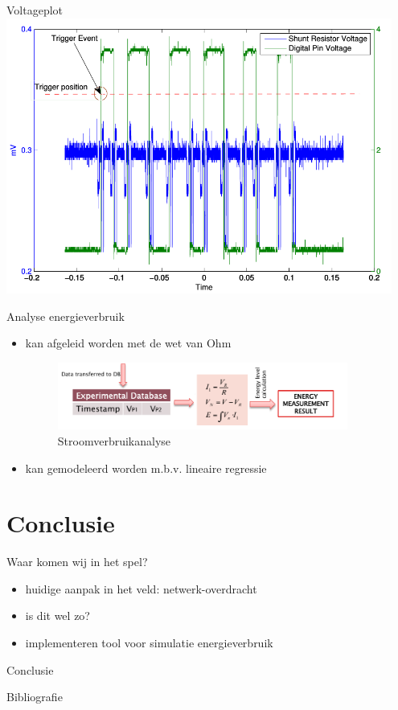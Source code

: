 \documentclass[presentation, bigger]{beamer}
\begin{document}
\begin{frame}[label=sec-3-4]{Voltageplot}
\includegraphics[width=0.95\textwidth,keepaspectration=true]{elek/energy_measurement_plot.png}
\end{frame}

\begin{frame}[label=sec-3-5]{Analyse energieverbruik}
\begin{itemize}
\item kan afgeleid worden met de wet van Ohm
  \begin{figure}
    \centering
    \includegraphics[width=0.9\textwidth,keepaspectration=true]{elek/diag2}

    \caption{Stroomverbruikanalyse}
  \end{figure}
\item kan gemodeleerd worden m.b.v. lineaire regressie
\end{itemize}
\end{frame}
\section{Conclusie}
\label{sec-4}
\begin{frame}[label=sec-4-1]{Waar komen wij in het spel?}
\begin{itemize}
\item huidige aanpak in het veld: netwerk-overdracht
\item is dit wel zo?
\item implementeren tool voor simulatie energieverbruik
\end{itemize}
\end{frame}

\begin{frame}[label=sec-4-2]{Conclusie}
\end{frame}
\begin{frame}[allowframebreaks]{Bibliografie}
\nocite{*}
\printbibliography
\end{frame}

\end{document}
